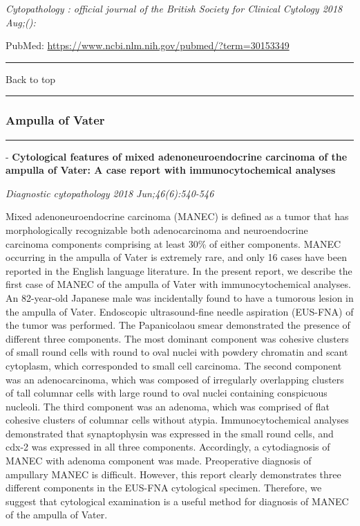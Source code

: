 \documentclass[]{article}
\begin{document}
\emph{Cytopathology : official journal of the British Society for
Clinical Cytology 2018 Aug;():}

PubMed: \url{https://www.ncbi.nlm.nih.gov/pubmed/?term=30153349}

{}

{}

\begin{center}\rule{0.5\linewidth}{\linethickness}\end{center}

Back to top

\begin{center}\rule{0.5\linewidth}{\linethickness}\end{center}

\pagebreak

\hypertarget{ampulla-of-vater-1}{%
\subsubsection{Ampulla of Vater}\label{ampulla-of-vater-1}}

\begin{center}\rule{0.5\linewidth}{\linethickness}\end{center}

 - \textbf{Cytological features of mixed adenoneuroendocrine carcinoma
of the ampulla of Vater: A case report with immunocytochemical analyses}

\emph{Diagnostic cytopathology 2018 Jun;46(6):540-546}

Mixed adenoneuroendocrine carcinoma (MANEC) is defined as a tumor that
has morphologically recognizable both adenocarcinoma and neuroendocrine
carcinoma components comprising at least 30\% of either components.
MANEC occurring in the ampulla of Vater is extremely rare, and only 16
cases have been reported in the English language literature. In the
present report, we describe the first case of MANEC of the ampulla of
Vater with immunocytochemical analyses. An 82-year-old Japanese male was
incidentally found to have a tumorous lesion in the ampulla of Vater.
Endoscopic ultrasound-fine needle aspiration (EUS-FNA) of the tumor was
performed. The Papanicolaou smear demonstrated the presence of different
three components. The most dominant component was cohesive clusters of
small round cells with round to oval nuclei with powdery chromatin and
scant cytoplasm, which corresponded to small cell carcinoma. The second
component was an adenocarcinoma, which was composed of irregularly
overlapping clusters of tall columnar cells with large round to oval
nuclei containing conspicuous nucleoli. The third component was an
adenoma, which was comprised of flat cohesive clusters of columnar cells
without atypia. Immunocytochemical analyses demonstrated that
synaptophysin was expressed in the small round cells, and cdx-2 was
expressed in all three components. Accordingly, a cytodiagnosis of MANEC
with adenoma component was made. Preoperative diagnosis of ampullary
MANEC is difficult. However, this report clearly demonstrates three
different components in the EUS-FNA cytological specimen. Therefore, we
suggest that cytological examination is a useful method for diagnosis of
MANEC of the ampulla of Vater.
\end{document}
